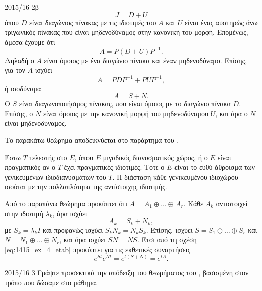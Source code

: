 \documentclass[a4paper,11pt]{article}
\begin{document}
\begin{solution}{2015/16 2β}
\begin{equation*}
        J = D + U
    \end{equation*}
    όπου \( D \) είναι διαγώνιος πίνακας με τις ιδιοτιμές του \( A \) και
    \( U \) είναι ένας αυστηρώς άνω τριγωνικός πίνακας που είναι μηδενοδύναμος
    στην κανονική του μορφή. Επομένως, άμεσα έχουμε ότι
    \begin{equation*}
        A = P(D + U)P^{-1}.
    \end{equation*}
    Δηλαδή ο \( A \) είναι όμοιος με ένα διαγώνιο πίνακα και έναν μηδενοδύναμο.
    Επίσης, για τον
    \( A \) ισχύει
    \begin{equation*}
        A = PDP^{-1} + PUP^{-1},
    \end{equation*}
    ή ισοδύναμα
    \begin{equation*}
        A = S + N.
    \end{equation*}
    Ο \(S\) είναι διαγωνοποιήσιμος πίνακας, που είναι
    όμοιος με το διαγώνιο πίνακα \(D\). Επίσης, ο \(N\) είναι όμοιος με την
    κανονική μορφή του μηδενοδύναμου \(U\), και άρα ο \( N \) είναι μηδενοδύναμος.

    Το παρακάτω θεώρημα αποδεικνύεται στο παράρτημα  του
    \cite{hirsch1974differential}.
    \begin{thrm}
        Έστω \(T\) τελεστής στο \(E\), όπου \(E\) μιγαδικός διανυσματικός χώρος,
        ή ο \(E\) είναι πραγματικός αν ο \(T\) έχει πραγματικές ιδιοτιμές. Τότε
        ο \(E\) είναι το ευθύ άθροισμα των γενικευμένων ιδιοδιανυσμάτων του
        \(T\). Η διάσταση κάθε γενικευμένου ιδιοχώρου ισούται με την
        πολλαπλότητα της αντίστοιχης ιδιοτιμής.
    \end{thrm}
    Από το παραπάνω θεώρημα προκύπτει ότι \(A = A_1 \oplus \dots \oplus A_r\).
    Κάθε \( A_k \) αντιστοιχεί στην ιδιοτιμή \( \lambda_k \), άρα ισχύει
    \begin{equation*}
        A_k = S_k + N_k,
    \end{equation*}
    με \( S_k = \lambda_k I \) και προφανώς ισχύει \( S_kN_k = N_kS_k \).
    Επίσης, ισχύει \(S = S_1 \oplus \dots \oplus S_r\) και
    \(N = N_1 \oplus \dots \oplus N_r\), και άρα ισχύει \( SN = NS \).
    Έτσι από τη σχέση \eqref{eq:1415_ex_4_etab} προκύπτει για τις εκθετικές
    συναρτήσεις
    \begin{equation*}
        e^{St}e^{Nt} = e^{t(S + N)} = e^{tA}.
    \end{equation*}
\end{solution}
\begin{exercise}{2015/16 3}
    Γράψτε προσεκτικά την απόδειξη του θεωρήματος του , βασισμένη
    στον τρόπο που δώσαμε στο μάθημα.
\end{exercise}
\end{document}

